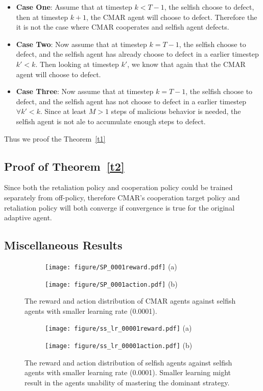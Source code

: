 \documentclass{article}
\begin{document}
\begin{itemize}
\item \textbf{Case One}:
Assume that at timestep \(k<T-1\), the selfish choose to defect, then at timestep \(k + 1\),
the CMAR agent will choose to defect.
Therefore the it is not the case where CMAR cooperates and selfish agent defects.

\item \textbf{Case Two}:
Now assume that at timestep \(k=T-1\), the selfish choose to defect,
and the selfish agent has already choose to defect in a earlier timestep \(k' < k\).
Then looking at timestep \(k'\), we know that again that the CMAR agent will choose to defect.

\item \textbf{Case Three}:
Now assume that at timestep \(k=T-1\), the selfish choose to defect,
and the selfish agent has not choose to defect in a earlier timestep \(\forall k' < k\).
Since at least \(M>1\) steps of malicious behavior is needed,
the selfish agent is not ale to accumulate enough steps to defect.
\end{itemize}
Thus we proof the Theorem~\ref{t1}
\subsection{Proof of Theorem~\ref{t2}}\label{appt2}
Since both the retaliation policy and cooperation policy could be trained separately from off-policy,
therefore CMAR's cooperation target policy and retaliation policy will both converge if convergence is true for the original adaptive agent.
\subsection{Miscellaneous Results}
\begin{figure}[!h]
    \centering
\begin{subfigure}{.48\textwidth}
\centering
\texttt{[image: figure/SP\_0001reward.pdf]}
(a)
\end{subfigure}
\begin{subfigure}{.48\textwidth}
\centering
\texttt{[image: figure/SP\_0001action.pdf]}
(b)
\end{subfigure}
    \caption{The reward and action distribution of CMAR agents against selfish agents with smaller learning rate (0.0001).}
\label{fig:misc-SP}
\end{figure}

\begin{figure}
    \centering
\begin{subfigure}{.48\textwidth}
\centering
\texttt{[image: figure/ss\_lr\_00001reward.pdf]}
(a)
\end{subfigure}
\begin{subfigure}{.48\textwidth}
\centering
\texttt{[image: figure/ss\_lr\_00001action.pdf]}
(b)
\end{subfigure}
    \caption{The reward and action distribution of selfish agents against selfish agents with smaller learning rate (0.0001). Smaller learning might result in the agents unability of mastering the dominant strategy.}
\label{fig:misc-SS}
\end{figure}
\end{document}
